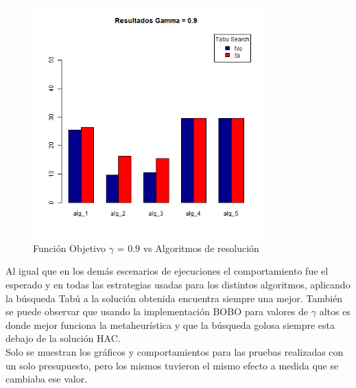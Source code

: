 \begin{figure}[H]
  \centering
    \includegraphics[width=0.8\textwidth]{resultados/cities/Graficos_agrupados/gamma09-cities.png}
  \caption{Función Objetivo $\gamma$ = $0.9$ vs Algoritmos de resolución}
  \label{res:img-cities-agr-gamma09}
\end{figure}

Al igual que en los demás escenarios de ejecuciones el comportamiento fue el esperado y en todas las estrategias usadas para los distintos algoritmos, aplicando la búsqueda Tabú a la solución obtenida encuentra siempre una mejor. También se puede observar que usando la implementación BOBO para valores de $\gamma$ altos es donde mejor funciona la metaheurística y que la búsqueda golosa siempre esta debajo de la solución HAC.\\

Solo se muestran los gráficos y comportamientos para las pruebas realizadas con un solo presupuesto, pero los mismos tuvieron el mismo efecto a medida que se cambiaba ese valor.
